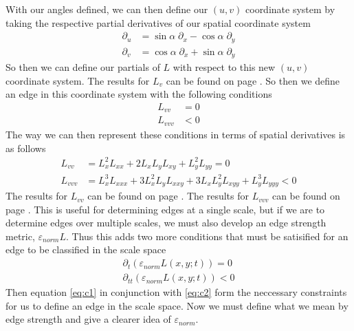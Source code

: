 \documentclass{article}
\begin{document}
With our angles defined, we can then define our $(u,v)$ coordinate system by taking the respective partial derivatives of our spatial coordinate system
\begin{align}
  \partial_u &= \sin{\alpha}\; \partial_x - \cos{\alpha}\; \partial_y \\
  \partial_v &= \cos{\alpha}\; \partial_x + \sin{\alpha}\; \partial_y
\end{align}
So then we can define our partials of $L$ with respect to this new $(u,v)$ coordinate system. The results for $L_v$ can be found on page \pageref{t_v}. So then we define an edge in this coordinate system with the following conditions \cite{Lindeberg1998}
\begin{equation} \label{eq:c1}
  \begin{aligned}
    L_{vv} &= 0 \\
    L_{vvv} &< 0
  \end{aligned}
\end{equation}
The way we can then represent these conditions in terms of spatial derivatives is as follows \cite{Lindeberg1998}
\begin{equation}
  \begin{aligned}
    L_{vv} &= L_x^2L_{xx}+2L_xL_yL_{xy}+L_y^2L_{yy} = 0 \\
    L_{vvv} &= L_x^3L_{xxx} +3L_x^2L_yL_{xxy}+3L_xL_y^2L_{xyy}+L_y^3L_{yyy} < 0
  \end{aligned}
\end{equation}
The results for $L_{vv}$ can be found on page \pageref{t_vv}.
The results for $L_{vvv}$ can be found on page \pageref{t_vvv}.
This is useful for determining edges at a single scale, but if we are to determine edges over multiple scales, we must also develop an edge strength metric, $\varepsilon_{norm}L$.
Thus this adds two more conditions that must be satisified for an edge to be classified in the scale space \cite{Lindeberg1998}
\begin{equation} \label{eq:c2}
  \begin{aligned}
    \partial_t(\varepsilon_{norm}L(x,y;t)) = 0\\
    \partial_{tt}(\varepsilon_{norm}L(x,y;t)) < 0
  \end{aligned}
\end{equation}
Then equation \ref{eq:c1} in conjunction with \ref{eq:c2} form the neccessary constraints for us to define an edge in the scale space.
Now we must define what we mean by edge strength and give a clearer idea of $\varepsilon_{norm}$.
\end{document}
